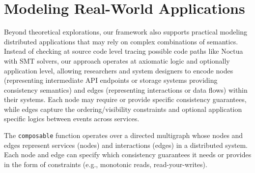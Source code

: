 \section{Modeling Real-World Applications}

Beyond theoretical explorations, our framework also supports practical modeling
distributed applications that may rely on complex combinations of semantics.
Instead of checking at source code level tracing possible code paths like Noctua
\cite{ma2024noctua} with SMT solvers, our approach operates at
axiomatic logic and
optionally application level, allowing researchers and system designers to
encode nodes (representing intermediate API endpoints or storage systems
providing consistency semantics) and edges (representing interactions or data
flows) within their systems. Each node may require or provide specific
consistency guarantees, while edges capture the ordering/visibility constraints
and optional application specific logics between events across services.

The \texttt{composable} function operates over a directed multigraph
whose nodes and
edges represent services (nodes) and interactions (edges) in a distributed
system. Each node and edge can specify which consistency guarantees it needs or
provides in the form of constraints (e.g., monotonic reads, read-your-writes).


